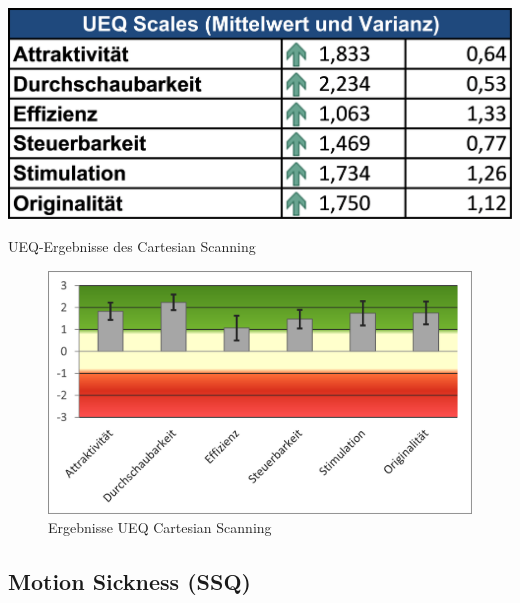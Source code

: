 \begin{table}[tbh]
    \centering
    \includegraphics{images/Results/UEQ-Table-Means-Cartesian.png}
    \caption{UEQ-Ergebnisse des Cartesian Scanning}
    \label{tab:ueqScalesCartesian}
\end{table}

\begin{figure}[tbh]
    \centering
    \includegraphics{images/Results/UEQ-Cartesian.png}
    \caption{Ergebnisse UEQ Cartesian Scanning}
    \label{fig:ueqScoreCartesian}
\end{figure}


\subsection{Motion Sickness (SSQ)} 

